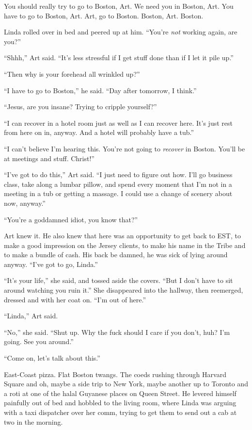 You should really try to go to Boston, Art. We need you in Boston,
Art. You have to go to Boston, Art. Art, go to Boston. Boston, Art.
Boston.

Linda rolled over in bed and peered up at him. “You’re \emph{not}
working again, are you?”

“Shhh,” Art said. “It’s less stressful if I get stuff done than if
I let it pile up.”

“Then why is your forehead all wrinkled up?”

“I have to go to Boston,” he said. “Day after tomorrow, I think.”

“Jesus, are you insane? Trying to cripple yourself?”

“I can recover in a hotel room just as well as I can recover here.
It’s just rest from here on in, anyway. And a hotel will probably
have a tub.”

“I can’t believe I’m hearing this. You’re not going to
\emph{recover} in Boston. You’ll be at meetings and stuff.
Christ!”

“I’ve got to do this,” Art said. “I just need to figure out how.
I’ll go business class, take along a lumbar pillow, and spend every
moment that I’m not in a meeting in a tub or getting a massage. I
could use a change of scenery about now, anyway.”

“You’re a goddamned idiot, you know that?”

Art knew it. He also knew that here was an opportunity to get back
to EST, to make a good impression on the Jersey clients, to make
his name in the Tribe and to make a bundle of cash. His back be
damned, he was sick of lying around anyway. “I’ve got to go,
Linda.”

“It’s your life,” she said, and tossed aside the covers. “But I
don’t have to sit around watching you ruin it.” She disappeared
into the hallway, then reemerged, dressed and with her coat on.
“I’m out of here.”

“Linda,” Art said.

“No,” she said. “Shut up. Why the fuck should I care if you don’t,
huh? I’m going. See you around.”

“Come on, let’s talk about this.”

East-Coast pizza. Flat Boston twangs. The coeds rushing through
Harvard Square and oh, maybe a side trip to New York, maybe another
up to Toronto and a roti at one of the halal Guyanese places on
Queen Street. He levered himself painfully out of bed and hobbled
to the living room, where Linda was arguing with a taxi dispatcher
over her comm, trying to get them to send out a cab at two in the
morning.

